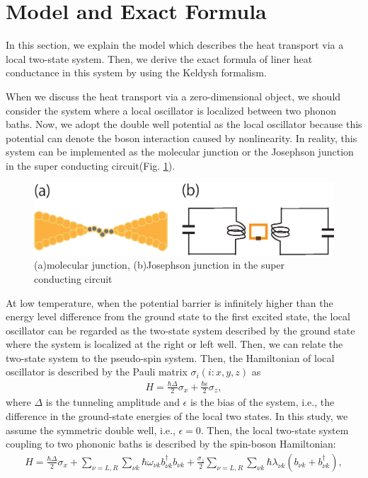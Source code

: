 \section{Model and Exact Formula}
In this section, we explain the model which describes the heat transport via a local two-state system.
Then, we derive the exact formula of liner heat conductance in this system by using the Keldysh formalism.

When we discuss the heat transport via a zero-dimensional object, we should consider the system where a local oscillator is localized between two phonon baths. 
Now, we adopt the double well potential as the local oscillator because this potential can denote the boson interaction caused by nonlinearity. In reality, this system can be implemented as the molecular junction or the Josephson junction in the super conducting circuit(Fig. \ref{fig:j_c}).
\begin{figure}[tb]
	\centering
	\includegraphics[width=130mm]{j_c.eps}
	\caption{(a)molecular junction, (b)Josephson junction in the super conducting circuit}
	\label{fig:j_c}
\end{figure}
At low temperature, when the potential barrier is infinitely higher than the energy level difference from the ground state to the first excited state, the local oscillator can be regarded as the two-state system described by the ground state where the system is localized at the right or left well.
Then, we can relate the two-state system to the pseudo-spin system. 
Then, the Hamiltonian of local oscillator is described by  the Pauli matrix $\sigma_{i}(i:x,y,z)$ as
\begin{eqnarray}
	H=\frac{\hbar \Delta}{2} \sigma_x+\frac{\hbar\epsilon}{2}\sigma_z,
\end{eqnarray}
where $\Delta$ is the tunneling amplitude and $\epsilon$ is the bias of the system, i.e., the difference in the ground-state energies of the local two states.
In this study, we assume the symmetric double well, i.e., $\epsilon=0$.
Then, the local two-state system coupling to two phononic baths is described by the spin-boson Hamiltonian:
\begin{eqnarray}
	H=\frac{\hbar \Delta}{2} \sigma_x 
	+\sum_{\nu=L,R}\sum_{\nu k}\hbar \omega_{\nu k } b_{\nu k}^{\dagger} b_{\nu k}
	+ \frac{\sigma_z}{2} \sum_{\nu=L,R}\sum_{\nu k} \hbar \lambda_{\nu k}(b_{\nu k}+b_{\nu k}^{\dagger}),
	\label{Hamiltonian}
\end{eqnarray}
